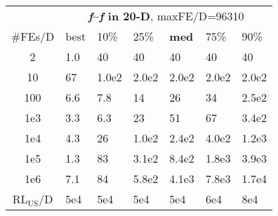 \begin{tabular}{c|llllll}
 & \multicolumn{6}{|c}{\textbf{\textit{f}\raisebox{-0.35ex}{1}--\textit{f}\raisebox{-0.35ex}{24} in 20-D}, maxFE/D=96310}\\
\#FEs/D & best & 10\% & 25\% & \textbf{med} & 75\% & 90\%\\
2 & \hspace*{1ex}1.0 & 40 & 40 & 40 & 40 & 40\\
10 & 67 & 1.0e2 & 2.0e2 & 2.0e2 & 2.0e2 & 2.0e2\\
100 & \hspace*{1ex}6.6 & \hspace*{1ex}7.8 & 14 & 26 & 34 & 2.5e2\\
1e3 & \hspace*{1ex}3.3 & \hspace*{1ex}6.3 & 23 & 51 & 67 & 3.4e2\\
1e4 & \hspace*{1ex}4.3 & 26 & 1.0e2 & 2.4e2 & 4.0e2 & 1.2e3\\
1e5 & \hspace*{1ex}1.3 & 83 & 3.1e2 & 8.4e2 & 1.8e3 & 3.9e3\\
1e6 & \hspace*{1ex}7.1 & 84 & 5.8e2 & 4.1e3 & 7.8e3 & 1.7e4\\
$\text{RL}_{\text{US}}$/D & 5e4 & 5e4 & 5e4 & 5e4 & 6e4 & 8e4
\end{tabular}
